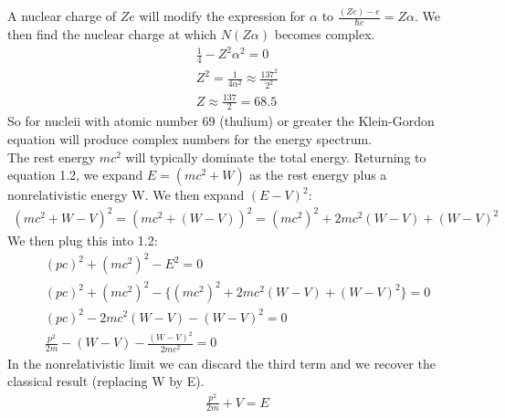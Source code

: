 \documentclass[a4paper,10pt]{article}
\numberwithin{equation}{section}
\begin{document}
A nuclear charge of $Ze$ will modify the expression for $\alpha$ to $\frac{(Ze)-e}{\hbar c}=Z\alpha$. 
We then find the nuclear charge at which $N(Z\alpha)$ becomes complex.
\begin{gather}
 \frac{1}{4}-Z^2\alpha ^2=0\\
 Z^2=\frac{1}{4\alpha^2}\approx\frac{137^2}{2^2}\\
 Z\approx \frac{137}{2}=68.5
\end{gather}
So for nucleii with atomic number 69 (thulium) or greater the Klein-Gordon equation will produce complex numbers for the energy spectrum.
\\
The rest energy $mc^2$ will typically dominate the total energy.
Returning to equation 1.2, we expand $E=(mc^2+W)$ as the rest energy plus a nonrelativistic energy W. 
We then expand $(E-V)^2$:
\begin{gather}
 (mc^2+W-V)^2=(mc^2+(W-V))^2=(mc^2)^2+2mc^2(W-V)+(W-V)^2
\end{gather}
We then plug this into 1.2:
\begin{gather}
 (pc)^2+(mc^2)^2-E^2=0\\
 (pc)^2+(mc^2)^2-\{(mc^2)^2+2mc^2(W-V)+(W-V)^2\}=0\\
 (pc)^2-2mc^2(W-V)-(W-V)^2=0\\
 \frac{p^2}{2m}-(W-V)-\frac{(W-V)^2}{2mc^2}=0
\end{gather}
In the nonrelativistic limit we can discard the third term and we recover the classical result (replacing W by E).
\begin{gather}
 \frac{p^2}{2m}+V=E
\end{gather}
\end{document}

